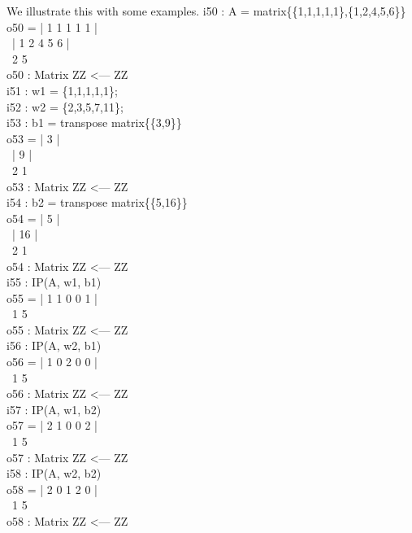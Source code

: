 We illustrate this with some examples.
\beginOutput
i50 : A = matrix\{\{1,1,1,1,1\},\{1,2,4,5,6\}\}\\
\emptyLine
o50 = | 1 1 1 1 1 |\\
\      | 1 2 4 5 6 |\\
\emptyLine
\               2        5\\
o50 : Matrix ZZ  <--- ZZ\\
\endOutput
\beginOutput
i51 : w1 = \{1,1,1,1,1\};\\
\endOutput
\beginOutput
i52 : w2 = \{2,3,5,7,11\};\\
\endOutput
\beginOutput
i53 : b1 = transpose matrix\{\{3,9\}\}\\
\emptyLine
o53 = | 3 |\\
\      | 9 |\\
\emptyLine
\               2        1\\
o53 : Matrix ZZ  <--- ZZ\\
\endOutput
\beginOutput
i54 : b2 = transpose matrix\{\{5,16\}\}\\
\emptyLine
o54 = | 5  |\\
\      | 16 |\\
\emptyLine
\               2        1\\
o54 : Matrix ZZ  <--- ZZ\\
\endOutput
\beginOutput
i55 : IP(A, w1, b1)\\
\emptyLine
o55 = | 1 1 0 0 1 |\\
\emptyLine
\               1        5\\
o55 : Matrix ZZ  <--- ZZ\\
\endOutput
\beginOutput
i56 : IP(A, w2, b1)\\
\emptyLine
o56 = | 1 0 2 0 0 |\\
\emptyLine
\               1        5\\
o56 : Matrix ZZ  <--- ZZ\\
\endOutput
\beginOutput
i57 : IP(A, w1, b2)\\
\emptyLine
o57 = | 2 1 0 0 2 |\\
\emptyLine
\               1        5\\
o57 : Matrix ZZ  <--- ZZ\\
\endOutput
\beginOutput
i58 : IP(A, w2, b2)\\
\emptyLine
o58 = | 2 0 1 2 0 |\\
\emptyLine
\               1        5\\
o58 : Matrix ZZ  <--- ZZ\\
\endOutput

